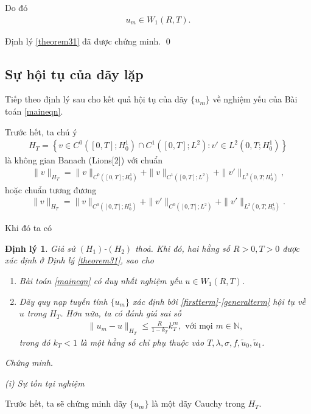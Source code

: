 \documentclass[12pt,a4paper]{article}
\def\N{\mathbb{N}}
\newtheorem{theorem}{Định lý}[section]
\theoremstyle{definition}
\theoremstyle{definition}
\begin{document}
Do đó
\begin{align}
    u_m \in W_1(R,T).
\end{align}

Định lý \ref{theorem31} đã được chứng minh. \qed

\subsection{Sự hội tụ của dãy lặp}

Tiếp theo định lý sau cho kết quả hội tụ của dãy $\{u_m\}$ về nghiệm yếu của Bài toán \eqref{maineqn}.

Trước hết, ta chú ý
\begin{align*}
    H_T = \left\{ v \in C^0([0,T]; H^1_0) \cap C^1([0,T]; L^2) \colon v' \in L^2(0,T;H^1_0) \right\}
\end{align*}
là không gian Banach (Lions[2]) với chuẩn
\begin{align*}
    \|v\|_{H_T} = \|v\|_{C^0([0,T]; H^1_0)} + \|v\|_{C^1([0,T]; L^2)} + \|v'\|_{L^2(0,T;H^1_0)},
\end{align*}
hoặc chuẩn tương đương
\begin{align*}
    \|v\|_{H_T} = \|v\|_{C^0([0,T]; H^1_0)} + \|v'\|_{C^0([0,T]; L^2)} + \|v'\|_{L^2(0,T;H^1_0)}.
\end{align*}

Khi đó ta có
\begin{theorem} \label{theorem33}
    Giả sử $(H_1)$-$(H_2)$ thoả. Khi đó, hai hằng số $R > 0, T > 0$ được xác định ở Định lý \ref{theorem31}, sao cho
    \begin{enumerate}
        \item Bài toán \eqref{maineqn} có duy nhất nghiệm yếu $u \in W_1(R,T)$.
        \item Dãy quy nạp tuyến tính $\{u_m\}$ xác định bởi \eqref{firstterm}-\eqref{generalterm} hội tụ về $u$ trong $H_T$. Hơn nữa, ta có đánh giá sai số
        \begin{align}
            \|u_m - u\|_{H_T} \le \frac{R}{1 - k_T}k_T^m, \text{ với mọi } m \in \N,
        \end{align}
        trong đó $k_T < 1$ là một hằng số chỉ phụ thuộc vào $T, \lambda, \sigma, f, \tilde{u}_0, \tilde{u}_1$.
    \end{enumerate}
\end{theorem}

\textit{Chứng minh.}

\textit{(i) Sự tồn tại nghiệm}

Trước hết, ta sẽ chứng minh dãy $\{u_m\}$ là một dãy Cauchy trong $H_T$.
\end{document}
